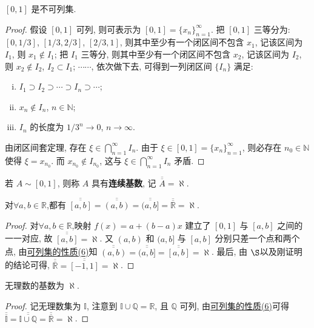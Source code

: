\documentclass[../../main.tex]{subfiles}
\begin{document}
\begin{theorem}
$[0, 1]$ 是不可列集.
\end{theorem}
\begin{proof}
假设 $[0, 1]$ 可列, 则可表示为 $[0, 1] = \{x_n\}_{n = 1}^{\infty}$.
把 $[0, 1]$ 三等分为: $[0, 1/3]$, $[1/3, 2/3]$, $[2/3, 1]$, 则其中至少有一个闭区间不包含 $x_1$, 记该区间为 $I_1$, 则 $x_1 \notin I_1$; 把 $I_1$ 三等分, 则其中至少有一个闭区间不包含 $x_2$, 记该区间为 $I_2$, 则 $x_2 \notin I_2$, $I_2 \subset I_1$; $\cdots\cdots$, 依次做下去, 可得到一列闭区间 $\{I_n\}$ 满足:
\begin{enumerate}[(i)]
\item $I_1 \supset I_2 \supset \cdots \supset I_n \supset \cdots$;
\item $x_n \notin I_n$, $n \in \mathbb{N}$;
\item $I_n$ 的长度为 $1/3^n \to 0$, $n \to \infty$.
\end{enumerate}
由闭区间套定理, 存在 $\xi \in \bigcap_{n = 1}^{\infty} I_n$. 由于 $\xi \in [0, 1] = \{x_n\}_{n = 1}^{\infty}$, 则必存在 $n_0 \in \mathbb{N}$ 使得 $\xi = x_{n_0}$. 而 $x_{n_0} \notin I_{n_0}$, 这与 $\xi \in \bigcap_{n = 1}^{\infty} I_n$ 矛盾. 
\end{proof}

\begin{definition}
若 $A \sim [0, 1]$, 则称 $A$ 具有\textbf{连续基数}, 记 $\overline{\overline{A}} = \aleph$.
\end{definition}

\begin{theorem}
对$\forall a,b\in \mathbb{R}$,都有
$\overline{\overline{[a, b]}} = \overline{\overline{(a, b)}} = \overline{\overline{(a, b]}} = \overline{\overline{\mathbb{R}}} = \aleph$.
\end{theorem}
\begin{proof}
对$\forall a,b\in \mathbb{R}$,映射 $f(x) = a + (b - a)x$ 建立了 $[0, 1]$ 与 $[a, b]$ 之间的一一对应, 故 $\overline{\overline{[a, b]}} = \aleph$. 又 $(a, b)$ 和 $(a, b]$ 与 $[a, b]$ 分别只差一个点和两个点, 由\hyperref[proposition:可列集的性质]{可列集的性质(6)}知 $\overline{\overline{(a, b)}} = \overline{\overline{(a, b]}} = \overline{\overline{[a, b]}} = \aleph$. 最后, 由 $\S$以及刚证明的结论可得, $\overline{\overline{\mathbb{R}}} = \overline{\overline{[-1, 1]}} = \aleph$.
\end{proof}

\begin{corollary}
无理数的基数为 $\aleph$.
\end{corollary}
\begin{proof}
记无理数集为 $\mathbb{I}$, 注意到 $\mathbb{I} \cup \mathbb{Q} = \mathbb{R}$, 且 $\mathbb{Q}$ 可列, 由\hyperref[proposition:可列集的性质]{可列集的性质(6)}可得 $\overline{\overline{\mathbb{I}}} = \overline{\overline{\mathbb{I} \cup \mathbb{Q}}} = \overline{\overline{\mathbb{R}}} = \aleph$. 
\end{proof}
\end{document}
